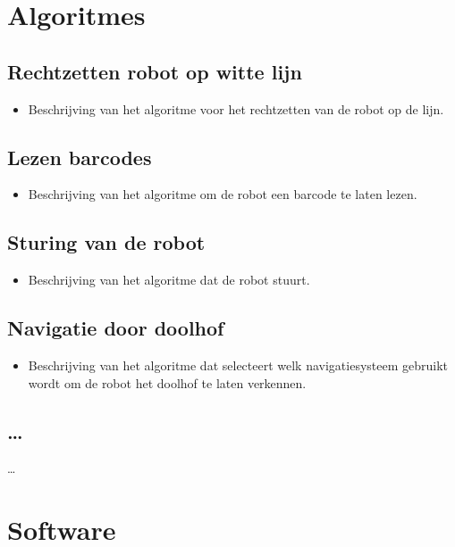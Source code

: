 \documentclass[eind]{penoverslag}
\begin{document}
\section{Algoritmes}
\lipsum[4]

\subsection{Rechtzetten robot op witte lijn}
\begin{itemize}
\item Beschrijving van het algoritme voor het rechtzetten van de robot op de lijn.
\end{itemize}

\subsection{Lezen barcodes}
\begin{itemize}
\item Beschrijving van het algoritme om de robot een barcode te laten lezen.
\end{itemize}

\subsection{Sturing van de robot}
\begin{itemize}
\item Beschrijving van het algoritme dat de robot stuurt.
\end{itemize}

\subsection{Navigatie door doolhof}
\begin{itemize}
\item Beschrijving van het algoritme dat selecteert welk navigatiesysteem gebruikt wordt om de robot het doolhof te laten verkennen.
\end{itemize}

\subsection{\ldots}
\ldots


\section{Software}
\lipsum[5]
\end{document}

